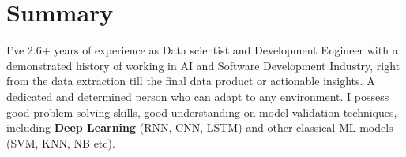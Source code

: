 \documentclass[letterpaper]{twentysecondcv} %
\begin{document}
\makeprofile %



\section{Summary}

I've 2.6+ years of experience as Data scientist and Development Engineer with a demonstrated history of working in AI and Software Development Industry, right from the data extraction till the final data product or actionable insights. A dedicated and determined person who can adapt to any environment. I possess good problem-solving skills, good understanding on model validation techniques, including \textbf{Deep Learning} (RNN, CNN, LSTM) and other classical ML models (SVM, KNN, NB etc). \vspace{2mm}
\end{document}
